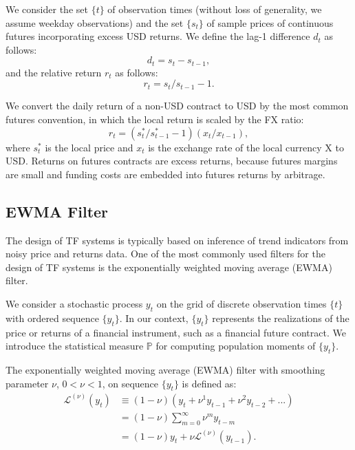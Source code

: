 \documentclass[hidelinks]{siamonline250211}
\begin{document}
\begin{definition}\label{eq:fm}
	We consider the set $\{t\}$ of observation times (without loss of generality, we assume weekday observations) and the set $\{s_{t}\}$ of sample prices of continuous futures incorporating excess USD returns.
	We define the lag-1 difference $d_{t}$ as follows:
	\begin{equation}\label{eq:int1} 
		d_{t} = s_{t} - s_{t-1},
	\end{equation}
	and the relative return $r_{t}$ as follows:
	\begin{equation} \label{eq:int2} 
		r_{t} = s_{t} / s_{t-1} - 1.
	\end{equation}
	
	We convert the daily return of a non-USD contract to USD by the most common futures convention, in which the local return is scaled by the FX ratio:
	\begin{equation} \label{eq:int3} 
		r_{t} = \left(s^{*}_{t}/s^{*}_{t-1}-1\right)\left(x_{t}/x_{t-1}\right),
	\end{equation}
	where $s^{*}_{t}$ is the local price and $x_{t}$ is the exchange rate of the local currency X to USD. Returns on futures contracts are excess returns, because futures margins are small and funding costs are embedded into futures returns by arbitrage.
	
\end{definition}


\subsection{EWMA Filter}

The design of TF systems is typically based on inference of trend indicators from noisy price and returns data. One of the most commonly used filters for the design of TF systems is the exponentially weighted moving average (EWMA) filter.

We consider a stochastic process $y_t$ on the grid of discrete observation times $\{t\}$ with ordered sequence $\{y_{t}\}$. In our context, $\{y_{t}\}$ represents the realizations of the price or returns of a financial instrument, such as a financial future contract. We introduce the statistical measure $\mathbb{P}$ for computing population moments of $\{y_{t}\}$.

\begin{definition} The exponentially weighted moving average (EWMA) filter with smoothing parameter $\nu$, $0<\nu<1$, on sequence $\{y_{t}\}$ is defined as:
	\begin{equation} \label{eq:ewma1} 
		\begin{split}
			\mathcal{L}^{(\nu)} (y_{t}) &  \equiv   \left(1-\nu \right)  \left(  y_{t} + \nu^{1} y_{t-1} + \nu^{2} y_{t-2}+... \right) \\
			&  =  \left(1-\nu \right)  \sum^{\infty}_{m=0} \nu^{m} y_{t-m}\\
			&  =  \left(1-\nu \right)y_{t} +  \nu\mathcal{L}^{(\nu)} (y_{t-1}).
		\end{split}
	\end{equation}
\end{definition}
\end{document}
